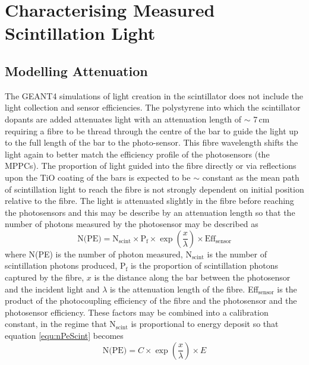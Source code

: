 \section{Characterising Measured Scintillation Light}
\subsection{Modelling Attenuation}\label{sec:GEANT4Simulation_ModellingAttenuation}
The GEANT4 simulations of light creation in the scintillator does not include the light collection and sensor efficiencies. The polystyrene into which the scintillator dopants are
added attenuates light with an attenuation length of $\sim$ 7\,cm requiring a fibre to be thread through the centre of the bar to guide the light up to the full length of the bar to the photo-sensor. This fibre wavelength shifts the light again to better match the efficiency profile of the photosensors (the MPPCs). The proportion of light guided into the fibre directly or via reflections upon the TiO coating of the bars is expected to be $\sim$ constant as the mean path of scintillation light to reach the fibre is not strongly dependent on initial position relative to the fibre. The light is attenuated slightly in the fibre before reaching the photosensors and this may be describe by an attenuation length so that the number of photons measured by the photosensor may be described as
\begin{equation}
    \textrm{N(PE)} = \textrm{N$_{\textrm{scint}}$} \times \textrm{P$_\textrm{f}$} \times \exp{ \left( \frac{x}{\lambda} \right) } \times \textrm{Eff$_{\textrm{sensor}}$}
\label{equ:nPeScint}
\end{equation}
where N(PE) is the number of photon measured, N$_{\textrm{scint}}$ is the number of scintillation photons produced, P$_\textrm{f}$ is the proportion of scintillation photons captured by the fibre, $x$ is the distance along the bar between the photosensor and the incident light and $\lambda$ is the attenuation length of the fibre. Eff$_{\textrm{sensor}}$ is the product of the photocoupling efficiency of the fibre and the photosensor and the photosensor efficiency. These factors may be combined into a calibration constant, in the regime that  N$_{\textrm{scint}}$ is proportional to energy deposit so that equation \ref{equ:nPeScint} becomes
\begin{equation}
     \textrm{N(PE)} = C \times \exp{ \left( \frac{x}{\lambda} \right) } \times E 
 \label{equ:nPeScint2}
 \end{equation}
